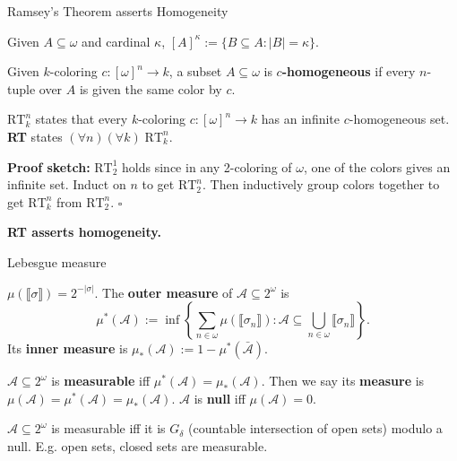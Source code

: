 \begin{frame}{Ramsey's Theorem asserts Homogeneity}
  \begin{notation*}
    Given $A\subseteq\omega$ and cardinal $\kappa$,
    $[A]^\kappa :=\{B\subseteq A:|B|=\kappa\}$.
  \end{notation*}

  \begin{define*}[$c$-homogeneous]
    Given $k$-coloring $c:[\omega]^n\rightarrow k$, a subset
    $A\subseteq\omega$ is \textbf{$c$-homogeneous} if every $n$-tuple over
    $A$ is given the same color by $c$.
  \end{define*}

  \begin{thm*}[Ramsey's]
    \textbf{$\text{RT}_k^n$} states that every $k$-coloring
    $c:[\omega]^n\rightarrow k$ has an infinite $c$-homogeneous set.
    \textbf{RT} states $(\forall n)(\forall k)\; \text{RT}_k^n$.
  \end{thm*}
  \textbf{Proof sketch:} $\text{RT}_2^1$ holds since in any 2-coloring of
  $\omega$, one of the colors gives an infinite set. Induct on $n$ to get
  $\text{RT}_2^n$. Then inductively group colors together to get
  $\text{RT}_k^n$ from $\text{RT}_2^n$. $\square$

  \vspace{0.5em}
  \textbf{RT asserts homogeneity.}
\end{frame}

\begin{frame}{Lebesgue measure}
  \begin{define*}
    $\mu(\llbracket\sigma\rrbracket) =2^{-|\sigma|}$. The \textbf{outer
    measure} of $\mathcal{A}\subseteq2^\omega$ is
    \[\mu^*(\mathcal{A}):= \inf\left\{\sum_{n\in\omega}
    \mu(\llbracket\sigma_n\rrbracket): \mathcal{A}\subseteq
    \bigcup_{n\in\omega} \llbracket\sigma_n\rrbracket\right\}.\]
    Its \textbf{inner measure} is $\mu_*(\mathcal{A}):=
    1-\mu^*(\bar{\mathcal{A}})$.
  \end{define*}

  \begin{define*}
    $\mathcal{A}\subseteq2^\omega$ is \textbf{measurable} iff
    $\mu^*(\mathcal{A}) =\mu_*(\mathcal{A})$.  Then we say its
    \textbf{measure} is $\mu(\mathcal{A}) =\mu^*(\mathcal{A})
    =\mu_*(\mathcal{A})$. $\mathcal{A}$ is \textbf{null} iff
    $\mu(\mathcal{A})=0$.
  \end{define*}
  \begin{fact*}[Measurable]
    $\mathcal{A}\subseteq2^\omega$ is measurable iff it is
    $G_\delta$ (countable intersection of open sets) modulo a null. E.g.
    open sets, closed sets are measurable.
  \end{fact*}
\end{frame}

